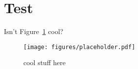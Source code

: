 \section{Test}
\label{sec:intro}

\paragraph{}
Isn't Figure~\ref{fig:placeholder} cool?

\begin{figure}[htb]
\centering
\texttt{[image: figures/placeholder.pdf]}
\caption{cool stuff here}
\label{fig:placeholder}
\end{figure}
